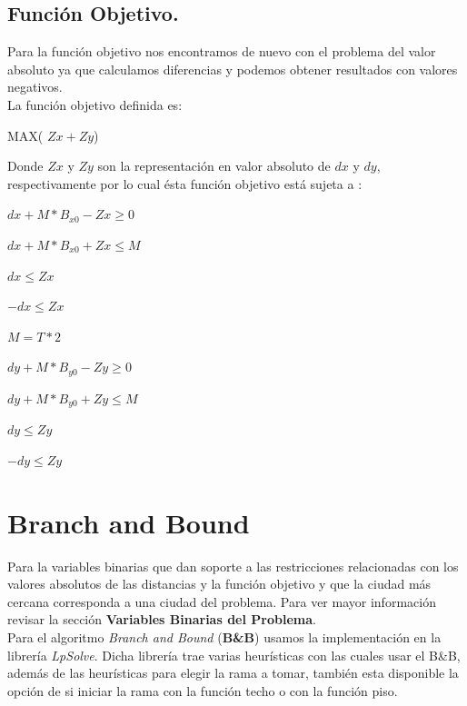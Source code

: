\documentclass[10pt]{article}
\begin{document}
\subsection{Funci\'on Objetivo.}

Para la funci\'on objetivo nos encontramos de nuevo con el problema del valor absoluto ya que calculamos diferencias y podemos obtener resultados con valores negativos.\\

La función objetivo definida es: 

\begin{center}
      MAX( $Zx + Zy$)
\end{center}

Donde $Zx$ y $Zy$ son la representaci\'on en valor absoluto de $dx$ y $dy$, respectivamente por lo cual ésta funci\'on objetivo está sujeta a : 

\begin{center}
$dx + M*B_{x0} - Zx \geq 0 $

$dx + M*B_{x0} + Zx \leq M $

$dx \leq Zx $

$-dx \leq Zx$

$M=T*2$

\end{center}


\begin{center}
$dy + M*B_{y0} - Zy \geq 0 $

$dy + M*B_{y0} + Zy \leq M $

$dy \leq Zy $

$-dy \leq Zy$

\end{center}

\newpage

\section{Branch and Bound}

Para la variables binarias que dan soporte a las restricciones relacionadas con los valores absolutos de las distancias y la función objetivo y que la ciudad más cercana corresponda
a una ciudad del problema. Para ver mayor información revisar la sección \textbf{Variables Binarias del Problema}.\\

Para el algoritmo \emph{Branch and Bound} (\textbf{B\&B}) usamos la implementación en la librería \emph{LpSolve}. Dicha librería trae varias heurísticas con las cuales usar
el B\&B, además de las heurísticas para elegir la rama a tomar, también esta disponible la opción de si iniciar la rama con la función techo o con la función piso.\\
\end{document}
